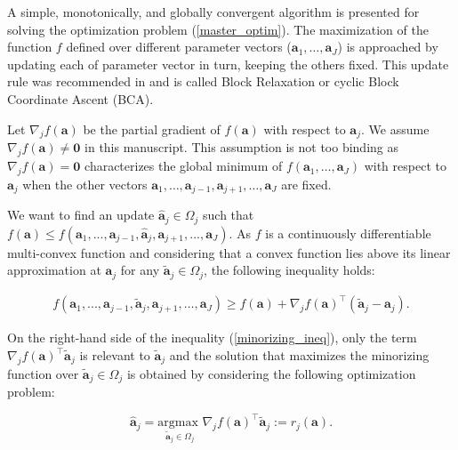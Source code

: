 \documentclass[
]{jss}
\begin{document}
A simple, monotonically, and globally convergent algorithm is presented
for solving the optimization problem (\ref{master_optim}). The
maximization of the function \(f\) defined over different parameter
vectors (\(\mathbf a_1, \ldots, \mathbf a_J\)) is approached by updating
each of parameter vector in turn, keeping the others fixed. This update
rule was recommended in \cite{DeLeeuw1994} and is called Block
Relaxation or cyclic Block Coordinate Ascent (BCA).

Let \(\nabla_j f( \mathbf a)\) be the partial gradient of
\(f( \mathbf a)\) with respect to \(\mathbf a_j\). We assume
\(\nabla_j f( \mathbf a) \neq \mathbf{0}\) in this manuscript. This
assumption is not too binding as \(\nabla_j f( \mathbf a) = \mathbf{0}\)
characterizes the global minimum of
\(f( \mathbf a_1 , \ldots ,  \mathbf a_J )\) with respect to
\(\mathbf a_j\) when the other vectors
\(\mathbf a_1 , \ldots ,  \mathbf a_{j-1} ,  \mathbf a_{j+1} , \ldots ,  \mathbf a_J\)
are fixed.

We want to find an update \(\hat{ \mathbf a}_j\in \Omega_j\) such that
\(f( \mathbf a)\leq f( \mathbf a_1, ...,  \mathbf a_{j-1}, \hat{ \mathbf a}_j,  \mathbf a_{j+1}, ...,  \mathbf a_J)\).
As \(f\) is a continuously differentiable multi-convex function and
considering that a convex function lies above its linear approximation
at \(\mathbf a_j\) for any \(\tilde{ \mathbf a}_j\in\Omega_j\), the
following inequality holds:

\begin{equation}
\begin{gathered}
f( \mathbf a_1, ...,  \mathbf a_{j-1}, \tilde{ \mathbf a}_j,  \mathbf a_{j+1}, \ldots,  \mathbf a_J) \geq f( \mathbf a) + \nabla_jf( \mathbf a)^\top(\tilde{ \mathbf a}_j -  \mathbf a_j).
\label{minorizing_ineq}
\end{gathered}
\end{equation}

On the right-hand side of the inequality (\ref{minorizing_ineq}), only
the term \(\nabla_jf( \mathbf a)^\top\tilde{ \mathbf a}_j\) is relevant
to \(\tilde{ \mathbf a}_j\) and the solution that maximizes the
minorizing function over \(\tilde{ \mathbf a}_j\in\Omega_j\) is obtained
by considering the following optimization problem:

\begin{equation}
\hat{ \mathbf a}_j = \underset{\tilde{ \mathbf a}_j\in\Omega_j}{\text{argmax }} \nabla_j f( \mathbf a)^\top \tilde{ \mathbf a}_j := r_j( \mathbf a).
\label{core_update}
\end{equation}
\end{document}
